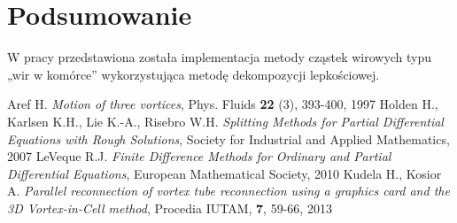 \documentclass[polish,twoside]{article}
\begin{document}
\section{Podsumowanie}

W pracy przedstawiona została implementacja metody cząstek wirowych typu „wir w komórce” wykorzystująca metodę dekompozycji lepkościowej.

\begin{thebibliography}{10}
{\small
{} Aref H.  \textit{Motion of three vortices}, Phys. Fluids \textbf{22} (3), 393-400, 1997
 Holden H., Karlsen K.H., Lie K.-A., Risebro W.H. \textit{Splitting Methods for Partial Differential Equations with Rough Solutions}, Society for Industrial and Applied Mathematics,  2007
 LeVeque R.J. \textit{Finite Difference Methods for Ordinary and Partial Differential Equations}, European Mathematical Society, 2010
 Kudela H., Kosior A. \textit{Parallel reconnection of vortex tube reconnection using a graphics card and the 3D Vortex-in-Cell method}, Procedia IUTAM, \textbf{7}, 59-66, 2013

}
\end{thebibliography}
\end{document}
